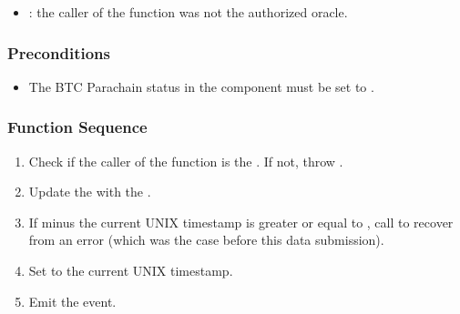 \documentclass[a4paper,10pt,english]{sphinxmanual}
\begin{document}
\begin{itemize}
\item {} 
: the caller of the function was not the authorized oracle.

\end{itemize}


\subsubsection{Preconditions}
\label{\detokenize{spec/oracle:preconditions}}\begin{itemize}
\item {} 
The BTC Parachain status in the {\hyperref[\detokenize{spec/security:security}]{}} component must be set to .

\end{itemize}


\subsubsection{Function Sequence}
\label{\detokenize{spec/oracle:function-sequence}}\begin{enumerate}
%
\item {} 
Check if the caller of the function is the . If not, throw .

\item {} 
Update the  with the .

\item {} 
If  minus the current UNIX timestamp is greater or equal to , call {\hyperref[\detokenize{spec/oracle:recoverfromoracleoffline}]{}} to recover from an  error (which was the case before this data submission).

\item {} 
Set  to the current UNIX timestamp.

\item {} 
Emit the  event.

\end{enumerate}
\end{document}
